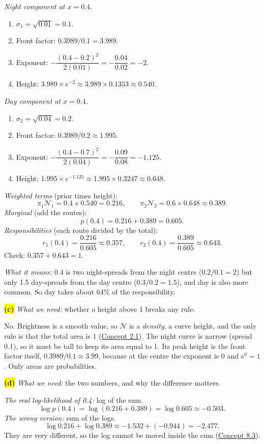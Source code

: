 \documentclass[12pt,a4paper]{article}
\begin{document}
\emph{Night component at $x=0.4$.}
\begin{enumerate}[nosep]
  \item $\sigma_1=\sqrt{0.01}=0.1$.
  \item Front factor: $0.3989/0.1=3.989$.
  \item Exponent: $-\dfrac{(0.4-0.2)^2}{2(0.01)}=-\dfrac{0.04}{0.02}=-2$.
  \item Height: $3.989\times e^{-2}\approx3.989\times0.1353\approx0.540$.
\end{enumerate}
\emph{Day component at $x=0.4$.}
\begin{enumerate}[nosep]
  \item $\sigma_2=\sqrt{0.04}=0.2$.
  \item Front factor: $0.3989/0.2\approx1.995$.
  \item Exponent: $-\dfrac{(0.4-0.7)^2}{2(0.04)}=-\dfrac{0.09}{0.08}=-1.125$.
  \item Height: $1.995\times e^{-1.125}\approx1.995\times0.3247\approx0.648$.
\end{enumerate}
\emph{Weighted terms} (prior times height):
\[
\pi_1\mathcal{N}_1=0.4\times0.540=0.216,\qquad \pi_2\mathcal{N}_2=0.6\times0.648\approx0.389 .
\]
\emph{Marginal} (add the routes):
\[
p(0.4)=0.216+0.389=0.605 .
\]
\emph{Responsibilities} (each route divided by the total):
\[
r_1(0.4)=\frac{0.216}{0.605}\approx0.357,\qquad r_2(0.4)=\frac{0.389}{0.605}\approx0.643 .
\]
Check: $0.357+0.643=1$.

\emph{What it means:} 0.4 is two night-spreads from the night centre ($0.2/0.1=2$) but only 1.5 day-spreads from the day centre ($0.3/0.2=1.5$), and day is also more common. So day takes about 64\% of the responsibility.

\colorbox{yellow}{\textbf{(c)}} \emph{What we need:} whether a height above 1 breaks any rule.

No. Brightness is a smooth value, so $\mathcal{N}$ is a \emph{density}, a curve height, and the only rule is that the total area is 1 (\hyperref[c2-1]{Concept 2.1}). The night curve is narrow (spread 0.1), so it must be tall to keep its area equal to 1. Its peak height is the front factor itself, $0.3989/0.1\approx3.99$, because at the centre the exponent is 0 and $e^0=1$. Only areas are probabilities.

\colorbox{yellow}{\textbf{(d)}} \emph{What we need:} the two numbers, and why the difference matters.

\emph{The real log-likelihood of 0.4:} log of the sum.
\[
\log p(0.4)=\log(0.216+0.389)=\log0.605\approx-0.503 .
\]
\emph{The wrong version:} sum of the logs.
\[
\log0.216+\log0.389\approx-1.532+(-0.944)=-2.477 .
\]
They are very different, so the log cannot be moved inside the sum (\hyperref[c8-3]{Concept 8.3}).
\end{document}
